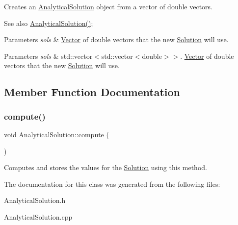 Creates an \hyperlink{class_analytical_solution}{Analytical\+Solution} object from a vector of double vectors. \begin{DoxySeeAlso}{See also}
\hyperlink{class_analytical_solution_a92a4ce87e863ec7f8aac59372306efd2}{Analytical\+Solution()}; 
\end{DoxySeeAlso}

\begin{DoxyParams}{Parameters}
{\em sols} & \hyperlink{class_vector}{Vector} of double vectors that the new \hyperlink{class_solution}{Solution} will use. \\
\hline
\end{DoxyParams}

\begin{DoxyParams}{Parameters}
{\em sols} & std\+::vector$<$std\+::vector$<$double$>$$>$. \hyperlink{class_vector}{Vector} of double vectors that the new \hyperlink{class_solution}{Solution} will use. \\
\hline
\end{DoxyParams}


\subsection{Member Function Documentation}
\mbox{\label{class_analytical_solution_ae1ebc556a8dfed55b6c463625545d919}} 
\subsubsection{\texorpdfstring{compute()}{compute()}}
{\footnotesize\ttfamily void Analytical\+Solution\+::compute (\begin{DoxyParamCaption}{ }\end{DoxyParamCaption})}

Computes and stores the values for the \hyperlink{class_solution}{Solution} using this method. 

The documentation for this class was generated from the following files\+:\begin{DoxyCompactItemize}
\item 
Analytical\+Solution.\+h\item 
Analytical\+Solution.\+cpp\end{DoxyCompactItemize}
